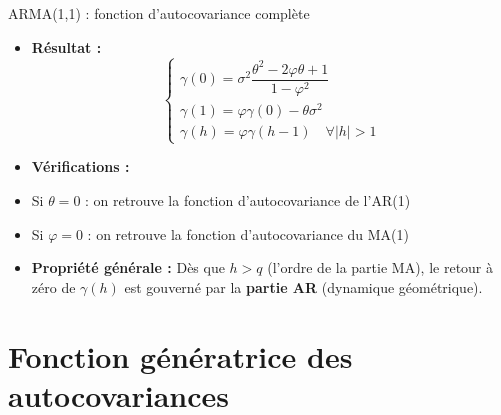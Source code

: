 \documentclass[11pt,aspectratio=169]{beamer}
\begin{document}
\begin{frame}{ARMA(1,1) : fonction d'autocovariance complète}

\begin{itemize}

\item \textbf{Résultat :} \[
\begin{cases}
\gamma(0) = \sigma^2 \dfrac{\theta^2 - 2\varphi\theta + 1}{1 - \varphi^2} \\[0.3cm]
\gamma(1) = \varphi \gamma(0) - \theta \sigma^2 \\[0.3cm]
\gamma(h) = \varphi \gamma(h-1) \quad \forall |h| > 1
\end{cases}
\]

\item \textbf{Vérifications :}\newline

\item Si $\theta = 0$ : on retrouve la fonction d'autocovariance de l'AR(1)\newline

\item Si $\varphi = 0$ : on retrouve la fonction d'autocovariance du MA(1)\newline

\item \textbf{Propriété générale :} Dès que $h > q$ (l'ordre de la partie MA), le retour à zéro de $\gamma(h)$ est gouverné par la \textbf{partie AR} (dynamique géométrique).

\end{itemize}
\end{frame}

\section{Fonction génératrice des autocovariances}
\end{document}
